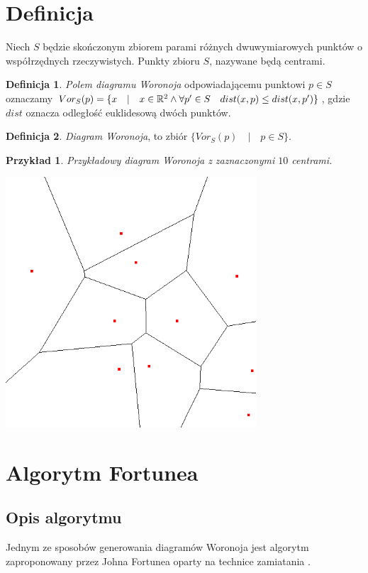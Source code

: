 \documentclass[declaration,shortabstract, inz]{iithesis}
\theoremstyle{definition} \newtheorem{definition}{Definicja}[]
\theoremstyle{plain} \newtheorem{remark}[definition]{Obserwacja}
\theoremstyle{plain} \newtheorem{theorem}[definition]{Twierdzenie}
\theoremstyle{plain} \newtheorem{example}{Przykład}[definition]
\theoremstyle{plain} \newtheorem{lemma}[definition]{Lemat}
\begin{document}
\section{Definicja}
Niech $S$ będzie skończonym zbiorem parami różnych dwuwymiarowych punktów o współrzędnych rzeczywistych. Punkty zbioru $S$, nazywane będą centrami.

\begin{definition}
	   \textit{Polem diagramu Woronoja} odpowiadającemu punktowi $p \in S$ oznaczamy $Vor_S(p) = \{ x \quad | \quad x 		\in \mathbb{R}^2 \land \forall p' \in S \quad \space dist(x, p) \leq dist(x, p')\}$, gdzie $dist$ oznacza odległość euklidesową dwóch punktów.
\end{definition}

\begin{definition}
	   \textit{Diagram Woronoja}, to zbiór $\{ Vor_S(p) \quad  | \quad p \in S\}$.
\end{definition}

\begin{example}
Przykładowy diagram Woronoja z zaznaczonymi $10$ centrami.
	\begin{center}
		\includegraphics[width=0.7\textwidth]{ExampleDiagram}
	\end{center}
\end{example}

\section{Algorytm Fortunea}
\subsection{Opis algorytmu}
Jednym ze sposobów  generowania diagramów Woronoja jest algorytm zaproponowany przez Johna Fortunea oparty na technice zamiatania \cite{miotla}. 
\end{document}
